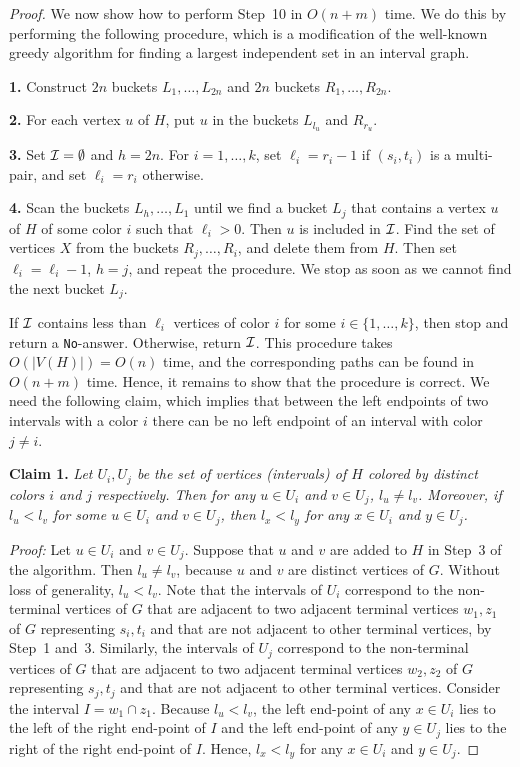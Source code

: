 \documentclass{llncs}
\begin{document}
\begin{proof}
We now show how to perform Step~10 in $O(n+m)$ time. We do this by performing the following procedure, which is a modification of the well-known greedy algorithm for finding a largest independent set in an interval graph.

\medskip
\noindent
{\bf 1.} Construct $2n$ buckets $L_1,\ldots,L_{2n}$ and $2n$ buckets $R_1,\ldots,R_{2n}$.

\medskip
\noindent
{\bf 2.} For each vertex $u$ of $H$, put $u$ in the buckets $L_{l_u}$ and $R_{r_u}$. 

\medskip
\noindent
{\bf 3.} Set ${\cal I}=\emptyset$ and $h=2n$. For $i=1,\ldots,k$, set $\ell_i=r_i-1$ if $(s_i,t_i)$ is a multi-pair, and set 
$\ell_i=r_i$ otherwise.

\medskip
\noindent
{\bf 4.}  Scan the buckets $L_{h},\ldots,L_1$ until we find a bucket $L_j$ that contains a vertex $u$ of $H$ of some color $i$ such that $\ell_i>0$. Then $u$ is included in $\cal I$. Find the set of vertices $X$ from the buckets $R_j,\ldots,R_i$, and delete them from $H$. Then  set $\ell_i=\ell_i-1$, $h=j$, and repeat the procedure. We stop as soon as we cannot find the next bucket $L_j$.   

\medskip
\noindent
If $\cal I$ contains less than $\ell_i$ vertices of color $i$ for some $i\in\{1,\ldots,k\}$, then stop and return a {\tt No}-answer.
Otherwise, return ${\cal I}$. 
This procedure takes $O(|V(H)|) = O(n)$ time, and the corresponding paths can be found in $O(n+m)$ time. Hence, it remains to show that the procedure is correct.  
We need the following claim,
which implies that between the left endpoints of two intervals with a color $i$ there can be no left endpoint of an interval with color $j \not=i$.

\medskip
\noindent
{\bf Claim 1.}
{\it Let $U_i,  U_j$ be the set of vertices (intervals) of $H$ colored by distinct colors $i$ and $j$ respectively. Then for any $u\in U_i$ and $v\in U_j$, $l_u\neq l_v$. Moreover,  if $l_u< l_v$ for some  $u\in U_i$ and $v\in U_j$, then $l_x<l_y$ for any $x\in U_i$ and $y\in U_j$.}

\medskip
\noindent
{\em Proof:}
Let $u\in U_i$ and $v\in U_j$. Suppose that $u$ and $v$ are added to $H$ in Step~3 of the algorithm.  Then $l_u\neq l_v$, because $u$ and $v$ are distinct vertices of $G$. Without loss of generality, $l_u< l_v$. 
Note that the intervals of $U_i$ correspond to the non-terminal vertices of $G$ that are adjacent to two adjacent terminal vertices $w_1,z_1$ of $G$ representing $s_i,t_i$ and that are not adjacent to other terminal vertices, by Step~1 and~3. Similarly, the intervals of $U_j$ correspond to the non-terminal vertices of $G$ that are adjacent to two adjacent terminal vertices $w_2,z_2$ of $G$ representing $s_j,t_j$ and that are not adjacent to other terminal vertices. Consider the interval $I=w_1\cap z_1$. Because  $l_u< l_v$,  the left end-point of  any $x\in U_i$ lies to the left of the right end-point of $I$ and the left end-point of  any $y\in U_j$ lies to the right of the right end-point of $I$. Hence, $l_x<l_y$ for any $x\in U_i$ and $y\in U_j$.


\end{proof}
\end{document}
